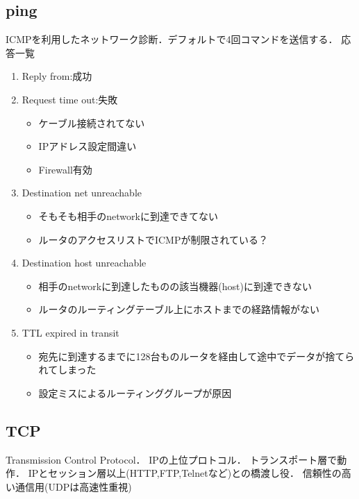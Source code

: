 \subsection{ping}
ICMPを利用したネットワーク診断．デフォルトで4回コマンドを送信する．
応答一覧
\begin{enumerate}
    \item Reply from:成功
    \item Request time out:失敗
    \begin{itemize}
        \item ケーブル接続されてない
        \item IPアドレス設定間違い
        \item Firewall有効
    \end{itemize}
    \item Destination net unreachable
    \begin{itemize}
        \item そもそも相手のnetworkに到達できてない
        \item ルータのアクセスリストでICMPが制限されている？
    \end{itemize}
    \item Destination host unreachable
    \begin{itemize}
        \item 相手のnetworkに到達したものの該当機器(host)に到達できない
        \item ルータのルーティングテーブル上にホストまでの経路情報がない
    \end{itemize}
    \item TTL expired in transit
    \begin{itemize}
        \item 宛先に到達するまでに128台ものルータを経由して途中でデータが捨てられてしまった
        \item 設定ミスによるルーティンググループが原因
    \end{itemize}
\end{enumerate}

\subsection{TCP}
Transmission Control Protocol．
IPの上位プロトコル．
トランスポート層で動作．
IPとセッション層以上(HTTP,FTP,Telnetなど)との橋渡し役．
信頼性の高い通信用(UDPは高速性重視)

